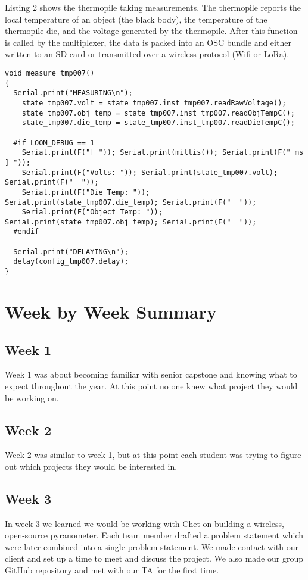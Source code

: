 \documentclass[10pt,draftclsnofoot,onecolumn,letterpaper]{article}
\begin{document}
Listing 2 shows the thermopile taking measurements. The thermopile reports the local temperature of an object (the black body), the temperature of the thermopile die, and the voltage generated by the thermopile. After this function is called by the multiplexer, the data is packed into an OSC bundle and either written to an SD card or transmitted over a wireless protocol (Wifi or LoRa). 

\begin{lstlisting}[caption={TMP007 Setup},captionpos=b]
void measure_tmp007() 
{
  Serial.print("MEASURING\n");
	state_tmp007.volt = state_tmp007.inst_tmp007.readRawVoltage();
	state_tmp007.obj_temp = state_tmp007.inst_tmp007.readObjTempC();
	state_tmp007.die_temp = state_tmp007.inst_tmp007.readDieTempC();

  #if LOOM_DEBUG == 1
    Serial.print(F("[ ")); Serial.print(millis()); Serial.print(F(" ms ] "));
    Serial.print(F("Volts: ")); Serial.print(state_tmp007.volt); Serial.print(F("  "));
    Serial.print(F("Die Temp: ")); Serial.print(state_tmp007.die_temp); Serial.print(F("  "));
    Serial.print(F("Object Temp: ")); Serial.print(state_tmp007.obj_temp); Serial.print(F("  "));
  #endif

  Serial.print("DELAYING\n");
  delay(config_tmp007.delay);
}
\end{lstlisting}

\section{Week by Week Summary}
\subsection{Week 1}
Week 1 was about becoming familiar with senior capstone and knowing what to expect throughout the year. At this point no one knew what project they would be working on.
\subsection{Week 2}
Week 2 was similar to week 1, but at this point each student was trying to figure out which projects they would be interested in. 
\subsection{Week 3}
In week 3 we learned we would be working with Chet on building a wireless, open-source pyranometer. Each team member drafted a problem statement which were later combined into a single problem statement. We made contact with our client and set up a time to meet and discuss the project. We also made our group GitHub repository and met with our TA for the first time. 
\end{document}
